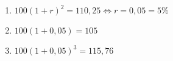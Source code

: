 \documentclass[10 pt,usenames,dvipsnames, oneside]{article}
\begin{document}
\ifdefined\prof
\begin{solucao}

\begin{enumerate}

\item{}
$100(1+r)^2 =110,25 \iff r=0,05 = 5\%$ 

\item{}
$100(1+0,05)=105$

\item{}
$100(1+0,05)^3=115,76$

\end{enumerate}
\end{solucao}
\fi
\end{document}
